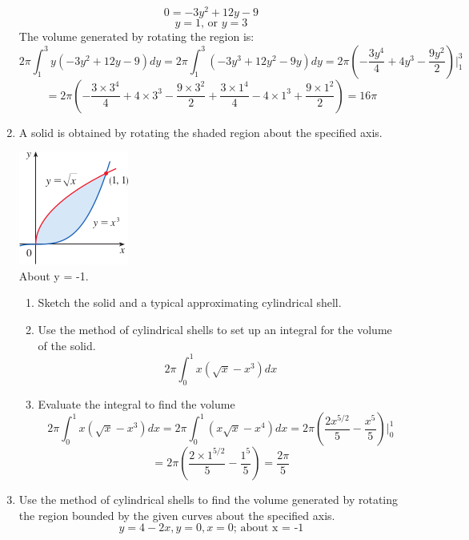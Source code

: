 \documentclass[12pt]{article}
\begin{document}
\begin{enumerate}
\begin{center}
    \end{center}
    \[0 = -3y^2 + 12y- 9\]
    \[y = 1 \text{, or }y = 3\]
    The volume generated by rotating the region is:
    \[2\pi\int_1^3y(-3y^2 + 12y - 9)dy = 2\pi\int_1^3(-3y^3 + 12y^2 - 9y)dy = 2\pi(-\frac{3y^4}{4} + 4y^3 - \frac{9y^2}{2})|_1^3\]
    \[= 2\pi(-\frac{3\times3^4}{4} + 4\times3^3 - \frac{9\times3^2}{2} + \frac{3\times1^4}{4} - 4\times1^3 + \frac{9\times1^2}{2}) = 16\pi\]
\newpage
\setcounter{enumi}{23}  
    \item A solid is obtained by rotating the shaded region about the specified axis. 
    \begin{center}
        \includegraphics{img/img-0.png}\\
        About y = -1.
    \end{center}
    \begin{enumerate}
        \item Sketch the solid and a typical approximating cylindrical shell.
        \item Use the method of cylindrical shells to set up an integral for the volume of the solid.
        \[2\pi\int_0^1x(\sqrt{x} - x^3)dx\]
        \item Evaluate the integral to find the volume
        \[2\pi\int_0^1x(\sqrt{x} - x^3)dx = 2\pi\int_0^1(x\sqrt{x} - x^4)dx = 2\pi(\frac{2x^{5/2}}{5} - \frac{x^5}{5})|_0^1\]
        \[=2\pi(\frac{2\times1^{5/2}}{5} - \frac{1^5}{5}) = \frac{2\pi}{5}\]
    \end{enumerate}
\setcounter{enumi}{25}  
    \item Use the method of cylindrical shells to find the volume generated by rotating the region bounded by the given curves about the specified axis.
    \[y=4-2x,y=0,x=0\text{; about x = -1}\]
    \begin{center}
\end{center}
\end{enumerate}
\end{document}
